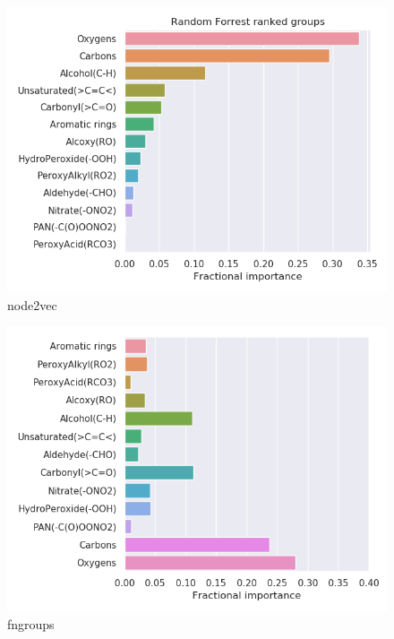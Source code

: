 \begin{subfigure}[b]{0.4\textwidth}
    \centering
    \includegraphics[width=\textwidth]{outputs/PCA/node2vec/legend.png}
    \caption{node2vec}
    \label{fig:legend_PCA_node2vec}
\end{subfigure}
\begin{subfigure}[b]{0.4\textwidth}
    \centering
    \includegraphics[width=\textwidth]{outputs/PCA/fngroups/legend.png}
    \caption{fngroups}
    \label{fig:legend_PCA_fngroups}
\end{subfigure}
